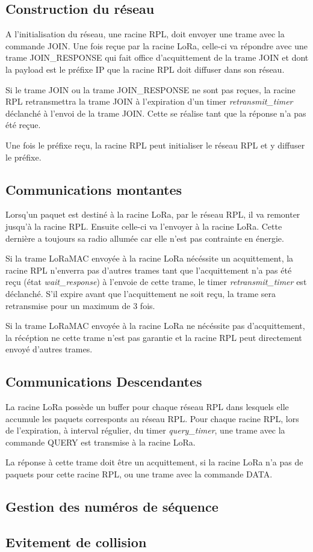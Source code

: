 \subsection{Construction du réseau}
    A l'initialisation du réseau, une racine RPL, doit envoyer une trame avec la commande JOIN. Une fois reçue par la racine LoRa, celle-ci va répondre avec une trame JOIN\_RESPONSE qui fait office d'acquittement de la trame JOIN et dont la payload est le préfixe IP que la racine RPL doit diffuser dans son réseau.

    Si le trame JOIN ou la trame JOIN\_RESPONSE ne sont pas reçues, la racine RPL retransmettra la trame JOIN à l'expiration d'un timer \textit{retransmit\_timer} déclanché à l'envoi de la trame JOIN. Cette se réalise tant que la réponse n'a pas été reçue.

    Une fois le préfixe reçu, la racine RPL peut initialiser le réseau RPL et y diffuser le préfixe.

\subsection{Communications montantes}
    Lorsq'un paquet est destiné à la racine LoRa, par le réseau RPL, il va remonter jusqu'à la racine RPL. Ensuite celle-ci va l'envoyer à la racine LoRa. Cette dernière a toujours sa radio allumée car elle n'est pas contrainte en énergie.

    Si la trame LoRaMAC envoyée à la racine LoRa nécéssite un acquittement, la racine RPL n'enverra pas d'autres trames tant que l'acquittement n'a pas été reçu (état \textit{wait\_response})
    à l'envoie de cette trame, le timer \textit{retransmit\_timer} est déclanché. S'il expire avant que l'acquittement ne soit reçu, la trame sera retransmise pour un maximum de 3 fois.

    Si la trame LoRaMAC envoyée à la racine LoRa ne nécéssite pas d'acquittement, la récéption ne cette trame n'est pas garantie et la racine RPL peut directement envoyé d'autres trames.

\subsection{Communications Descendantes}
    La racine LoRa possède un buffer pour chaque réseau RPL dans lesquels elle accumule les paquets corresponts au réseau RPL. Pour chaque racine RPL, lors de l'expiration, à interval régulier, du timer \textit{query\_timer}, une trame avec la commande QUERY est transmise à la racine LoRa.

    La réponse à cette trame doit être un acquittement, si la racine LoRa n'a pas de paquets pour cette racine RPL, ou une trame avec la commande DATA.

    


\subsection{Gestion des numéros de séquence}

\subsection{Evitement de collision}
